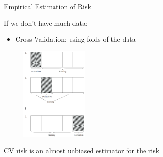 \documentclass[xcolor=pdftex,dvipsnames,table]{beamer}
\begin{document}
\begin{frame}{Empirical Estimation of Risk}
  	\par
  	\scriptsize
  	\textcolor{NavyBlue}{If we don't have much data: \\}
  	\begin{itemize}
  		\item Cross Validation: using folds of the data
  	\end{itemize}
    \begin{figure}[ht!]
    	 \centering\includegraphics[width=0.3\textwidth]{figure2-2.png}
	\end{figure}
    CV risk is an almost unbiased estimator for the risk
\end{frame}
\end{document}
